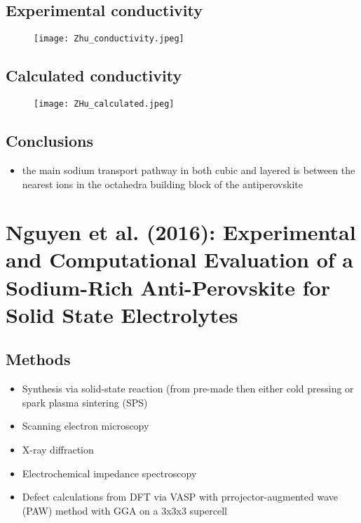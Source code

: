 \documentclass[10pt,a4paper, titlepage]{article}
\begin{document}
\subsection{Experimental conductivity}

\begin{figure}[H]
\centering
\texttt{[image: Zhu\_conductivity.jpeg]}
\end{figure}

\subsection{Calculated conductivity}

\begin{figure}[H]
\centering
\texttt{[image: ZHu\_calculated.jpeg]}
\end{figure}

\subsection{Conclusions}

\begin{itemize}
  \item the main sodium transport pathway in both cubic  and layered  is between the nearest  ions in the  octahedra building block of the antiperovskite
\end{itemize}

\section{Nguyen et al. (2016): Experimental and Computational Evaluation of a Sodium-Rich
Anti-Perovskite for Solid State Electrolytes}

\subsection{Methods}

\begin{itemize}
  \item Synthesis via solid-state reaction (from pre-made  then either cold pressing or spark plasma sintering (SPS)
  \item Scanning electron microscopy
  \item X-ray diffraction
  \item Electrochemical impedance spectroscopy
  \item Defect calculations from DFT via VASP with prrojector-augmented wave (PAW) method with GGA on a 3x3x3 supercell
\end{itemize}
\end{document}
